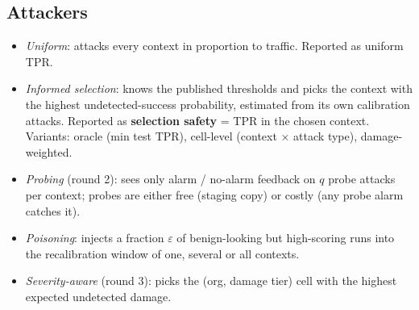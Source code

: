 \documentclass[11pt]{article}
\begin{document}
\subsection{Attackers}
\begin{itemize}
\item \emph{Uniform}: attacks every context in proportion to traffic. Reported as uniform TPR.
\item \emph{Informed selection}: knows the published thresholds and picks the context with the highest undetected-success probability, estimated from its own calibration attacks. Reported as \textbf{selection safety} = TPR in the chosen context. Variants: oracle (min test TPR), cell-level (context $\times$ attack type), damage-weighted.
\item \emph{Probing} (round 2): sees only alarm / no-alarm feedback on $q$ probe attacks per context; probes are either free (staging copy) or costly (any probe alarm catches it).
\item \emph{Poisoning}: injects a fraction $\varepsilon$ of benign-looking but high-scoring runs into the recalibration window of one, several or all contexts.
\item \emph{Severity-aware} (round 3): picks the (org, damage tier) cell with the highest expected undetected damage.
\end{itemize}
\end{document}
